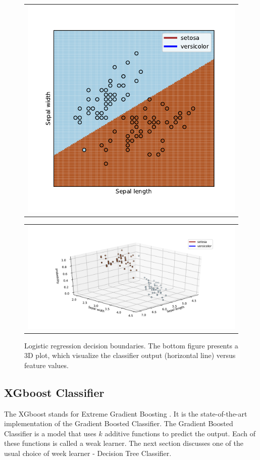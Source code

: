 \begin{figure}
  \centering
  \begin{tabular}{@{}c@{}}
    \includegraphics[width=0.6\linewidth]{figures/decision_boundaries_lr.pdf}
  \end{tabular}

  \vspace{\floatsep}

  \begin{tabular}{@{}c@{}}
    \includegraphics[width=\linewidth]{figures/3D_log_reg.pdf}
  \end{tabular}

  \caption{Logistic regression decision boundaries. The bottom figure presents a 3D plot, which visualize the classifier output (horizontal line) versus feature values.  
\label{fig:LRdecision boundary}}  
\end{figure}



\subsection{XGboost Classifier}
\label{sed:xgboost}
The XGboost stands for Extreme Gradient Boosting \cite{xgboost}. It is the state-of-the-art implementation of the Gradient Boosted Classifier. The Gradient Boosted Classifier is a model that uses $k$ additive functions to predict the output.  
Each of these functions is called a weak learner. The next section discusses one of the usual choice of week learner - Decision Tree Classifier. 


